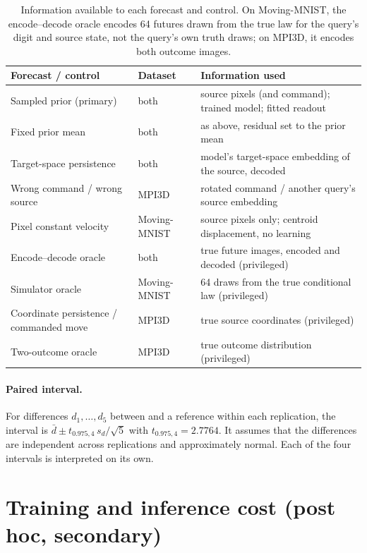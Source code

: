 \begin{table}[htbp]
\caption{Information available to each forecast and control. On Moving-MNIST, the encode--decode oracle encodes 64 futures drawn from the true law for the query's digit and source state, not the query's own truth draws; on MPI3D, it encodes both outcome images.}
\label{tab:controls}
\centering
\scriptsize
\begin{tabular}{@{}lll@{}}
\toprule
Forecast / control & Dataset & Information used \\
\midrule
Sampled prior (primary) & both & source pixels (and command); trained model; fitted readout \\
Fixed prior mean & both & as above, residual set to the prior mean \\
Target-space persistence & both & model's target-space embedding of the source, decoded \\
Wrong command / wrong source & MPI3D & rotated command / another query's source embedding \\
Pixel constant velocity & Moving-MNIST & source pixels only; centroid displacement, no learning \\
Encode--decode oracle & both & true future images, encoded and decoded (privileged) \\
Simulator oracle & Moving-MNIST & 64 draws from the true conditional law (privileged) \\
Coordinate persistence / commanded move & MPI3D & true source coordinates (privileged) \\
Two-outcome oracle & MPI3D & true outcome distribution (privileged) \\
\bottomrule
\end{tabular}
\end{table}

\paragraph{Paired interval.} For differences $d_1,\dots,d_5$ between \shvar{} and a reference within each replication, the interval is $\bar d\pm t_{0.975,4}\,s_d/\sqrt5$ with $t_{0.975,4}=2.7764$. It assumes that the differences are independent across replications and approximately normal. Each of the four intervals is interpreted on its own.


\FloatBarrier
\section{Training and inference cost (post hoc, secondary)}
\label{app:cost}

